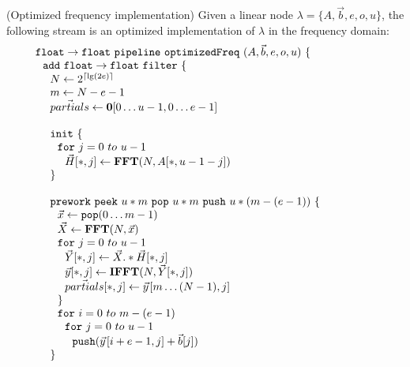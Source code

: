 \begin{transformation} (Optimized frequency implementation)
Given a linear node $\lambda = \{A, {\vec b}, e, o, u\}$, the
following stream is an optimized implementation of $\lambda$ in the
frequency domain: \\
\begin{equation} \nonumber
  \begin{array}{ll}

    {\tt float \rightarrow float}~{\tt pipeline~optimizedFreq~}(A, {\vec b}, e, o, u){\tt ~\{} & \hspace{40pt}\\
    ~~{\tt add~float \rightarrow float~filter~\{}\\
    ~~~~N \leftarrow 2^{\lceil \lg(2e) \rceil} \\
    ~~~~m \leftarrow N-e-1 \\
    ~~~~\vec{partials} \leftarrow \mathbf{0}[0\dots u-1,0 \dots e-1] \\
    \\
    ~~~~{\tt init}~{\tt \{} \\
    ~~~~~~{\tt for}~j=0~to~u-1\\
    ~~~~~~~~\vec{H}[*,j] \leftarrow \mathbf{FFT}(N,A[*,u-1-j]) \\
    ~~~~{\tt \}} \\
    \\
    ~~~~{\tt prework}~{\tt peek}~u*m~{\tt pop}~u*m~{\tt push}~u*(m-(e-1))~{\tt \{}\\
    ~~~~~~\vec{x} \leftarrow {\tt pop}(0 \dots m-1) \\
    ~~~~~~\vec{X} \leftarrow \mathbf{FFT} (N, \vec{x}) \\
    ~~~~~~{\tt for}~j=0~to~u-1\\
    ~~~~~~~~\vec{Y}[*,j] \leftarrow \vec{X} .* \vec{H}[*,j] \\
    ~~~~~~~~\vec{y}[*,j] \leftarrow \mathbf{IFFT}(N, \vec{Y}[*,j]) \\
    ~~~~~~~~\vec{partials}[*,j] \leftarrow \vec{y}\hspace{1pt}[m \dots (N-1),j]\\
    ~~~~~~{\tt \}} \\
    ~~~~~~{\tt for}~i=0~to~m-(e-1)\\
    ~~~~~~~~{\tt for}~j=0~to~u-1\\
    ~~~~~~~~~~{\tt push}(\vec{y}\hspace{1pt}[i+e-1,j] + \vec{b}[j]) \\
    ~~~~{\tt \}} \\

\end{array}
\end{equation}
\end{transformation}
